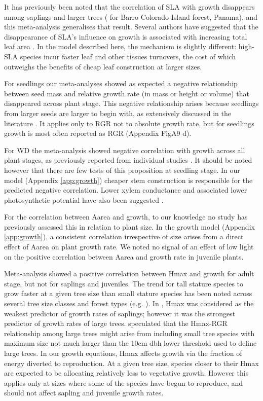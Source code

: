 \documentclass[a4paper]{article}\usepackage[]{graphicx}\usepackage[]{color}
\begin{document}
It has previously been noted that the correlation of SLA with growth disappears among saplings and larger trees (\citealt{Wright:2010tp} for Barro Colorado Island forest, Panama), and this meta-analysis generalises that result. Several authors have suggested that the disappearance of SLA's influence on growth is associated with increasing total leaf area \citep{Reich:1992wm,Poorter:2008iu,Wright:2010tp}. In the model described here, the mechanism is slightly different: high-SLA species incur faster leaf and other tissues turnovers, the cost of which outweighs the benefits of cheap leaf construction at larger sizes.

For seedlings our meta-analyses showed as expected a negative relationship between seed mass and relative growth rate (in mass or height or volume) that disappeared across plant stage. This negative relationship arises because seedlings from larger seeds are larger to begin with, as extensively discussed in the literature \citep[reviewed by][]{Turnbull:2012ew}. It applies only to RGR not to absolute growth rate, but for seedlings growth is most often reported as RGR (Appendix FigA9 d).

For WD the meta-analysis showed negative correlation with growth across all plant stages, as previously reported from individual studies \citep{Wright:2010tp,Ruger:2012jv}. It should be noted however that there are few tests of this proposition at seedling stage. In our model (Appendix \ref{app:growth}) cheaper stem construction is responsible for the predicted negative correlation. Lower xylem conductance and associated lower photosynthetic potential have also been suggested \citep[reviewed by][]{Chave:2009iy}.

For the correlation between Aarea and growth, to our knowledge no study has previously assessed this in relation to plant size. In the growth model (Appendix \ref{app:growth}), a consistent correlation irrespective of size arises from a direct effect of Aarea on plant growth rate. We noted no signal of an effect of low light on the positive correlation between Aarea and growth rate in juvenile plants.

Meta-analysis showed a positive correlation between Hmax and growth for adult stage, but not for saplings and juveniles. The trend for tall stature species to grow faster at a given tree size than small stature species has been noted across several tree size classes and forest types (e.g. \citealt{Poorter:2008iu,Wright:2010tp,Herault:2011dd,Ruger:2012jv,Iida:2014ep}). In \citet{Wright:2010tp}, Hmax was considered as the weakest predictor of growth rates of saplings; however it was the strongest predictor of growth rates of large trees. \citet{Poorter:2008iu} speculated that the Hmax-RGR relationship among large trees might arise from including small tree species with maximum size not much larger than the  10cm dbh lower threshold used to define large trees. In our growth equations, Hmax affects growth via the fraction of energy diverted to reproduction. At a given tree size, species closer to their Hmax are expected to be allocating relatively less to vegetative growth. However this applies only at sizes where some of the species have begun to reproduce, and should not affect sapling and juvenile growth rates.
\end{document}
